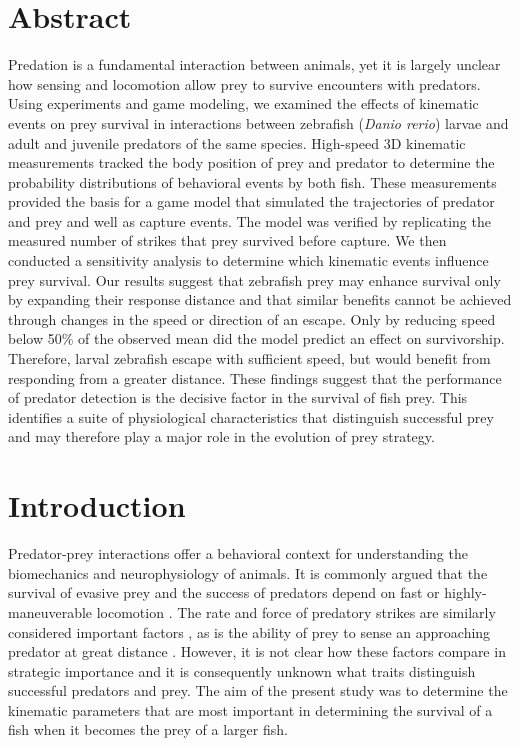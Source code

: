 \documentclass[]{rsos}%
\begin{document}
\section*{Abstract}
Predation is a fundamental interaction between animals, yet it is largely unclear how sensing and locomotion allow prey to survive encounters with predators.
Using experiments and game modeling, we examined the effects of kinematic events on prey survival in interactions between zebrafish (\textit{Danio rerio}) larvae and adult and juvenile predators of the same species.
High-speed 3D kinematic measurements tracked the body position of prey and predator to determine the probability distributions of behavioral events by both fish.
These measurements provided the basis for a game model that simulated the trajectories of predator and prey and well as capture events. 
The model was verified by replicating the measured number of strikes that prey survived before capture.
We then conducted a sensitivity analysis to determine which kinematic events influence prey survival.
Our results suggest that zebrafish prey may enhance survival only by expanding their response distance and that similar benefits cannot be achieved through changes in the speed or direction of an escape.
Only by reducing speed below 50\% of the observed mean did the model predict an effect on survivorship.
Therefore, larval zebrafish escape with sufficient speed, but would benefit from responding from a greater distance.
These findings suggest that the performance of predator detection is the decisive factor in the survival of fish prey.
This identifies a suite of physiological characteristics that distinguish successful prey and may therefore play a major role in the evolution of prey strategy.


\section{Introduction}

Predator-prey interactions offer a behavioral context for understanding the biomechanics and neurophysiology of animals.
It is commonly argued that the survival of evasive prey and the success of predators depend on fast or highly-maneuverable locomotion \cite{Alexander:BbR35qCj, Wilson:2013fda, Walker:2005vn, Domenici:2011tv, Howland:1974ud}.
The rate and force of predatory strikes are similarly considered important factors \cite{deVries:2012tc, Holzman:2009uu}, as is the ability of prey to sense an approaching predator at great distance \cite{Dill:1972wh, Gabbiani:1999wz}.
However, it is not clear how these factors compare in strategic importance and it is consequently unknown what traits distinguish successful predators and prey. 
The aim of the present study was to determine the kinematic parameters that are most important in determining the survival of a fish when it becomes the prey of a larger fish.
\end{document}
